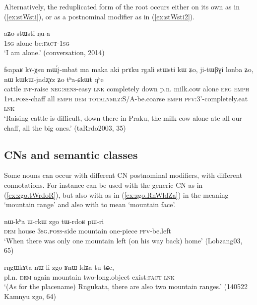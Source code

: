 Alternatively, the reduplicated form of the root  occurs either on its own as in (\ref{ex:stWsti}), or as a postnominal modifier as in (\ref{ex:stWsti2}).

\begin{exe}
\ex \label{ex:stWsti}
\gll aʑo stɯsti ŋu-a \\
\textsc{1sg} alone be:\textsc{fact}-\textsc{1sg} \\
\glt `I am alone.' (conversation, 2014)
\end{exe}

\begin{exe}
\ex \label{ex:stWsti2}
\gll  fsapaʁ kɤ-χsu mɯ́j-mbat ma maka aki prɤku rgali stɯsti kɯ ʑo, ji-tɯβɣi lonba ʑo, nɯ kɯ\redp{}kɯ-jndʐɤz ʑo tʰa-ɕkɯt qʰe \\
cattle \textsc{inf}-raise \textsc{neg}:\textsc{sens}-easy \textsc{lnk} completely down p.n. milk.cow alone \textsc{erg} \textsc{emph} \textsc{1pl}.\textsc{poss}-chaff all \textsc{emph} \textsc{dem} \textsc{total}\redp{}\textsc{nmlz}:S/A-be.coarse \textsc{emph} \textsc{pfv}:3'-completely.eat \textsc{lnk} \\
\glt `Raising cattle is difficult, down there in Praku, the milk cow alone ate all our chaff, all the big ones.' (taRrdo2003, 35)
\end{exe}

\subsection{CNs and semantic classes} \label{sec:CN.classification}


Some nouns can occur with different CN postnominal modifiers, with different connotations. For instance  can be used with the generic CN  as in (\ref{ex:zgo.tWrdoR}), but also with    as in (\ref{ex:zgo.RnWldZa}) in the meaning `mountain range' and also with  to mean `mountain face'.

\begin{exe}
\ex \label{ex:zgo.tWrdoR}
 \gll nɯ-kʰa ɯ-rkɯ zgo tɯ-rdoʁ pɯ-ri \\
\textsc{dem} house \textsc{3sg}.\textsc{poss}-side mountain one-piece \textsc{pfv}-be.left  \\
\glt `When there was only one mountain left (on his way back) home' (Lobzang03, 65)
\end{exe}

\begin{exe}
\ex \label{ex:zgo.RnWldZa}
 \gll rŋgɯkɤta nɯ li zgo ʁnɯ-ldʑa tu tɕe, \\
pl.n. \textsc{dem} again mountain two-long.object exist:\textsc{fact} \textsc{lnk} \\
\glt `(As for the placename) Rngukata, there are also two mountain ranges.' (140522 Kamnyu zgo, 64)
\end{exe}


